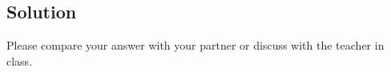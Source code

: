 \subsection*{Solution}
Please compare your answer with your partner or discuss with the teacher in class.




%
%
%
%
%




